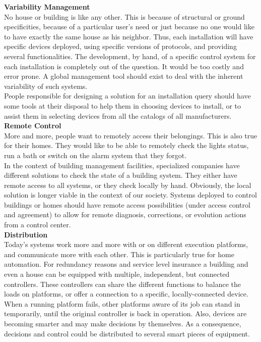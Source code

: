 {\bf Variability Management}\\
No house or building is like any other. This is because of structural or ground specificities, because of a particular user's need or just because no one would like to have exactly the same house as his neighbor. Thus, each installation will have specific devices deployed, using specific versions of protocols, and providing several functionalities. The development, by hand, of a specific control system for each installation is completely out of the question. It would be too costly and error prone. A global management tool should exist to deal with the inherent variability of such systems.\\
People responsible for designing a solution for an installation query should have some tools at their disposal to help them in choosing devices to install, or to assist them in selecting devices from all the catalogs of all manufacturers.\\

{\bf Remote Control}\\
More and more, people want to remotely access their belongings. This is also true for their homes. They would like to be able to remotely check the lights status, run a bath or switch on the alarm system that they forgot.\\
In the context of building management facilities, specialized companies have different solutions to check the state of a building system. They either have remote access to all systems, or they check locally by hand. Obviously, the local solution is longer viable in the context of our society. Systems deployed to control buildings or homes should have remote access possibilities (under access control and agreement) to allow for remote diagnosis, corrections, or evolution actions from a control center.\\

{\bf Distribution}\\
Today's systems work more and more with or on different execution platforms, and communicate more with each other. This is particularly true for home automation. For redundancy reasons and service level insurance a building and even a house can be equipped with multiple, independent, but connected controllers. These controllers can share the different functions to balance the loads on platforms, or offer a connection to a specific, locally-connected device. When a running platform fails, other platforms aware of its job can stand in temporarily, until the original controller is back in operation. Also, devices are becoming smarter and may make decisions by themselves. As a consequence, decisions and control could be distributed to several smart pieces of equipment.\\

